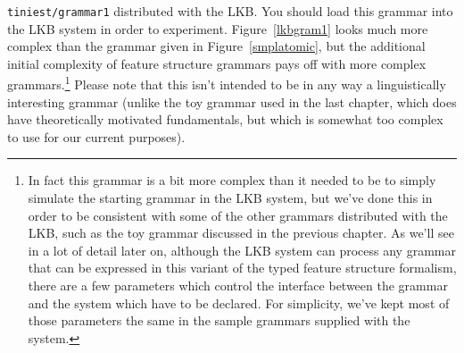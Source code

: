 \documentclass[12pt]{report}
\newcommand{\filename}[1]{{\tt #1}}
\begin{document}
\filename{tiniest/grammar1} distributed with the LKB.
You should load this grammar into the LKB system in order to
experiment.
Figure~\ref{lkbgram1} looks much more complex than the grammar given 
in Figure~\ref{smplatomic}, but 
the 
additional initial complexity of feature structure grammars pays off 
with more complex grammars.\footnote{In fact this grammar is a bit
more complex than it needed to be 
to simply simulate the starting grammar in the LKB system, but we've
done this in order to be consistent with 
some of the other grammars distributed 
with the LKB, such as the toy grammar discussed in the previous
chapter.  As we'll see in a lot of detail later on,
although the LKB system can process any grammar that
can be expressed in this variant of the typed feature structure 
formalism, there are a few parameters which control the interface 
between the grammar and the system which have to be declared.  
For simplicity, we've kept most of those parameters the same in
the sample grammars supplied with the system.}
Please note that this isn't intended to be in any way a linguistically
interesting grammar
(unlike the toy grammar used in the last
chapter, which does have theoretically motivated fundamentals,
but which is somewhat too complex to use for our current
purposes).  
\end{document}
